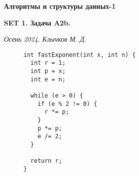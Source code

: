 \documentclass[11pt,a4paper]{scrarticle}
\author{Клычков Максим Дмитриевич}
\theoremstyle{definition}
\begin{document}
\centerline{\textbf{\huge Алгоритмы и структуры данных-1}}
\centerline{\textbf{SET 1. Задача A2b.}}
\begin{flushright}
	\emph{Осень 2024. Клычков М. Д.}
\end{flushright}

\begin{figure}[htp]
	\centering
	\begin{minipage}{0.4\textwidth}
		\begin{verbatim}
int fastExponent(int x, int n) {
  int r = 1;
  int p = x;
  int e = n;

  while (e > 0) {
    if (e % 2 != 0) {
      r *= p;
    }
    p *= p;
    e /= 2;
  }

  return r;
}
		\end{verbatim}
	\end{minipage}
\end{figure}
\end{document}
